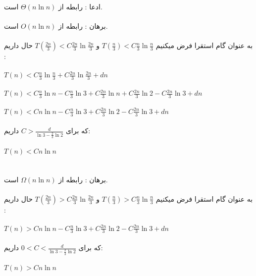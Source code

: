 
\subproblem{}
ادعا : رابطه از $\Theta(n\ln{n})$ است.\\\\
برهان : رابطه از $O(n\ln{n})$ است. \\\\
به عنوان گام استقرا فرض میکنیم $T(\frac{n}{3}) < C\frac{n}{3}\ln{\frac{n}{3}}$ و  $T(\frac{2n}{3}) < C\frac{2n}{3}\ln{\frac{2n}{3}}$ حال داریم : \\\\
$T(n) < C\frac{n}{3}\ln{\frac{n}{3}} + C\frac{2n}{3}\ln{\frac{2n}{3}} + dn$\\\\
$T(n) < C\frac{n}{3}\ln{n} - C\frac{n}{3}\ln{3}+ C\frac{2n}{3}\ln{n}+C\frac{2n}{3}\ln{2} - C\frac{2n}{3}\ln{3} + dn$\\\\
$T(n) < Cn\ln{n} - C\frac{n}{3}\ln{3}+C\frac{2n}{3}\ln{2} - C\frac{2n}{3}\ln{3} + dn$\\\\
که برای $C>\frac{d}{\ln{3}-\frac{2}{3}\ln{2}}$ داریم:\\\\
$T(n) < Cn\ln{n}$\\\\\\

برهان : رابطه از $\Omega(n\ln{n})$ است. \\\\
به عنوان گام استقرا فرض میکنیم $T(\frac{n}{3}) > C\frac{n}{3}\ln{\frac{n}{3}}$ و  $T(\frac{2n}{3}) > C\frac{2n}{3}\ln{\frac{2n}{3}}$ حال داریم : \\\\
$T(n) > Cn\ln{n} - C\frac{n}{3}\ln{3}+C\frac{2n}{3}\ln{2} - C\frac{2n}{3}\ln{3} + dn$\\\\
که برای $0<C<\frac{d}{\ln{3}-\frac{2}{3}\ln{2}}$ داریم:\\\\
$T(n) > Cn\ln{n}$\\\\\\